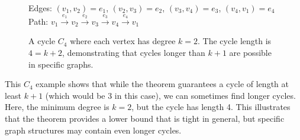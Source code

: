 \documentclass{article}
\theoremstyle{definition}
\begin{document}
\begin{figure}[h]
\centering
{}

\begin{center}
\small Edges: $(v_1,v_2) = e_1$, $(v_2,v_3) = e_2$, $(v_3,v_4) = e_3$, $(v_4,v_1) = e_4$\\
Path: $v_1 \xrightarrow{e_1} v_2 \xrightarrow{e_2} v_3 \xrightarrow{e_3} v_4 \xrightarrow{e_4} v_1$
\end{center}
\caption{A cycle $C_4$ where each vertex has degree $k=2$. The cycle length is $4 = k+2$, demonstrating that cycles longer than $k+1$ are possible in specific graphs.}
\label{fig:c4-long-cycle}
\end{figure}

This $C_4$ example shows that while the theorem guarantees a cycle of length at least $k+1$ (which would be 3 in this case), we can sometimes find longer cycles. Here, the minimum degree is $k=2$, but the cycle has length 4. This illustrates that the theorem provides a lower bound that is tight in general, but specific graph structures may contain even longer cycles.
\end{document}
